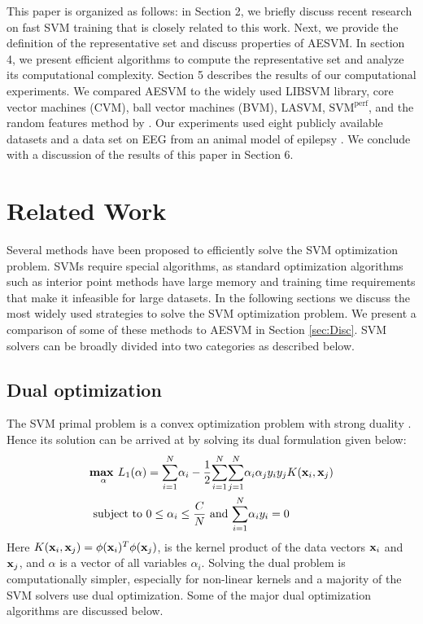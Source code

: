 \documentclass[twoside]{article}
\begin{document}
This paper is organized as follows: in Section 2, we briefly discuss recent research on fast SVM training that is closely related to this work. Next, we provide the definition of the representative set and discuss properties of AESVM. In section 4, we present efficient algorithms to compute the representative set and analyze its computational complexity. Section 5 describes the results of our computational experiments. We compared AESVM to the widely used LIBSVM library, core vector machines (CVM), ball vector machines (BVM), LASVM, $\text{SVM}^{\text{perf}}$, and the random features method by \citet{rahimi07}. Our experiments used eight publicly available datasets and a data set on EEG from an animal model of epilepsy \citep{Talathi08,Nandan10}. We conclude with a discussion of the results of this paper in Section 6.


\section{Related Work} \label{sec:relWork}

Several methods have been proposed to efficiently solve the SVM optimization problem. SVMs require special algorithms, as standard optimization algorithms such as interior point methods \citep{Boyd04,Shwartz11} have large memory and training time requirements that make it infeasible for large datasets. In the following sections we discuss the most widely used strategies to solve the SVM optimization problem. We present a comparison of some of these methods to AESVM in Section \ref{sec:Disc}. SVM solvers can be broadly divided into two categories as described below.
\subsection{Dual optimization} \label{sec:otherDual}
The SVM primal problem is a convex optimization problem with strong duality \citep{Boyd04}. Hence its solution can be arrived at by solving its dual formulation given below:
\begin{align} \label{eq:SVC_dual}
&\underset{\alpha}{\textbf{max }} L_1(\alpha) =  \overset{N}{\underset{i = 1}{\sum}}\alpha_{i} - \frac{1}{2}\overset{N}{\underset{i = 1}{\sum}}\overset{N}{\underset{j = 1}{\sum}}\alpha_{i}\alpha_{j}y_{i}y_{j}K({\bf x}_{i},{\bf x}_{j})\\
&\text{ subject to } 0 \le \alpha_i \le \frac{C}{N} \text{ and } \underset{i = 1}{\overset{N}{\sum}}\alpha_{i}y_i = 0  \nonumber
\end{align}
Here $K({\bf x}_{i},{\bf x}_{j}) = \phi({\bf x}_i)^T\phi({\bf x}_j)$, is the kernel product \citep{Scholkopf01} of the data vectors ${\bf x}_i$ and ${\bf x}_j$, and $\alpha$ is a vector of all variables $\alpha_i$. Solving the dual problem is computationally simpler, especially for non-linear kernels and a majority of the SVM solvers use dual optimization. Some of the major dual optimization algorithms are discussed below.
\end{document}
